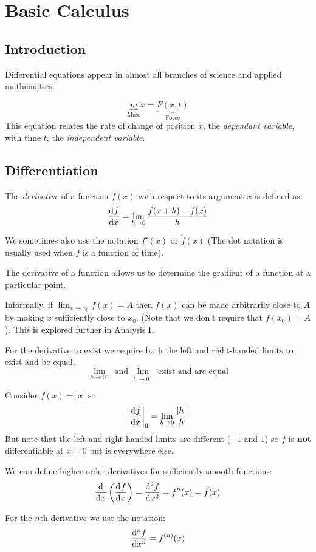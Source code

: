 \documentclass[../main.tex]{subfiles}
\begin{document}
\chapter{Basic Calculus}
\section{Introduction}
Differential equations appear in almost all branches of science and applied mathematics.
\begin{example}
  \[
    \underbrace{m}_{\text{Mass}} \ddot{x} = \underbrace{F(x, t)}_{\text{Force}}
  \]
  This equation relates the rate of change of position $x$, the \textit{dependant variable}, with time $t$, the \textit{independent variable}.
\end{example}
\section{Differentiation}
\begin{definition}[Derivative]
  The \textit{derivative} of a function $f(x)$ with respect to its argument $x$ is defined as:
  \[
    \deriv{f}{x} = \lim_{h \to 0} \frac{f(x + h) - f(x)}{h}
  \]
\end{definition}
\begin{remark}[Notation]
  We sometimes also use the notation $f'(x)$ or $\dot{f}(x)$ (The dot notation is usually used when $f$ is a function  of time).
\end{remark}
The derivative of a function allows us to determine the gradient of a function at a particular point.
\begin{definition}
  Informally, if $\lim_{x \to x_0} f(x) = A$ then $f(x)$ can be made arbitrarily close to $A$ by making $x$ sufficiently close to $x_0$.
  (Note that we don't require that $f(x_0) = A$).
  This is explored further in Analysis I.
\end{definition}
\begin{remark}[Note]
  For the derivative to exist we require both the left and right-handed limits to exist and be equal.
  \[
    \lim_{h \to 0^-} \text{ and } \lim_{h \to 0^+} \text{ exist and are equal}
  \]
\end{remark}
\begin{example}
  Consider $f(x) = |x|$ so
  \[
    \at{\deriv{f}{x}}{0} = \lim_{h \to 0} \frac{|h|}{h}
  \]
  But note that the left and right-handed limits are different ($-1$ and $1$) so $f$ is \textbf{not} differentiable at $x = 0$ but is everywhere else.
\end{example}
We can define higher order derivatives for sufficiently smooth functions:
\[
  \deriv{}{x}\left(\deriv{f}{x}\right) = \deriv[2]{f}{x} = f''(x) = \ddot{f}(x)
\]
\begin{remark}[Notation]
  For the $n$th derivative we use the notation:
  \[
    \deriv[n]{f}{x} = f^{(n)}(x) 
  \]
\end{remark}
\end{document}
